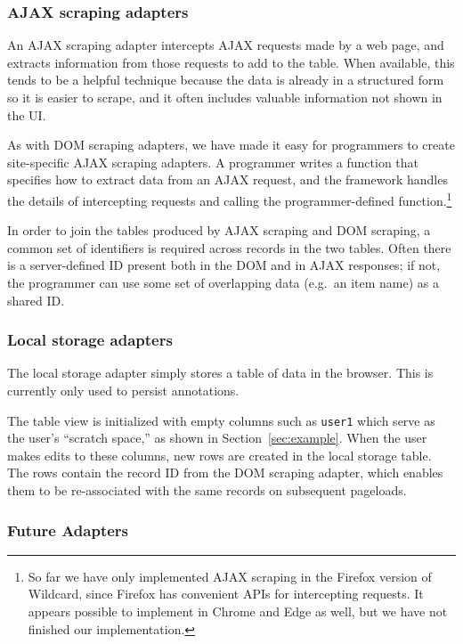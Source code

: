 \documentclass[sigplan,screen,10pt,anonymous,review]{acmart}
\begin{document}
\hypertarget{ajax-scraping-adapters}{%
\subsubsection{AJAX scraping adapters}\label{ajax-scraping-adapters}}

An AJAX scraping adapter intercepts AJAX requests made by a web page,
and extracts information from those requests to add to the table. When
available, this tends to be a helpful technique because the data is
already in a structured form so it is easier to scrape, and it often
includes valuable information not shown in the UI.

As with DOM scraping adapters, we have made it easy for programmers to
create site-specific AJAX scraping adapters. A programmer writes a
function that specifies how to extract data from an AJAX request, and
the framework handles the details of intercepting requests and calling
the programmer-defined function.\footnote{So far we have only
  implemented AJAX scraping in the Firefox version of Wildcard, since
  Firefox has convenient APIs for intercepting requests. It appears
  possible to implement in Chrome and Edge as well, but we have not
  finished our implementation.}

In order to join the tables produced by AJAX scraping and DOM scraping,
a common set of identifiers is required across records in the two
tables. Often there is a server-defined ID present both in the DOM and
in AJAX responses; if not, the programmer can use some set of
overlapping data (e.g.~an item name) as a shared ID.

\hypertarget{local-storage-adapters}{%
\subsubsection{Local storage adapters}\label{local-storage-adapters}}

The local storage adapter simply stores a table of data in the browser.
This is currently only used to persist annotations.

The table view is initialized with empty columns such as \texttt{user1}
which serve as the user's ``scratch space,'' as shown in
Section~\ref{sec:example}. When the user makes edits to these columns,
new rows are created in the local storage table. The rows contain the
record ID from the DOM scraping adapter, which enables them to be
re-associated with the same records on subsequent pageloads.

\hypertarget{future-adapters}{%
\subsubsection{Future Adapters}\label{future-adapters}}
\end{document}
